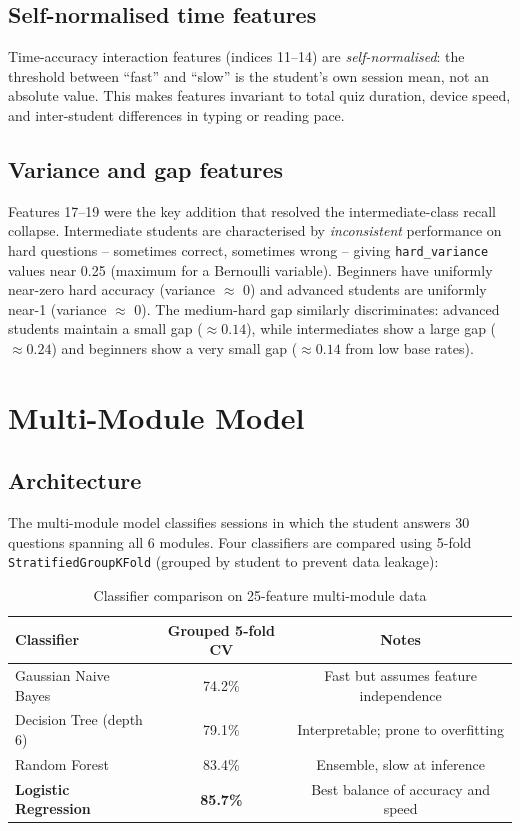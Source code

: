 \documentclass[12pt,a4paper]{article}
\begin{document}
\subsection{Self-normalised time features}

Time-accuracy interaction features (indices 11--14) are \emph{self-normalised}: the
threshold between ``fast'' and ``slow'' is the student's own session mean, not an
absolute value. This makes features invariant to total quiz duration, device speed,
and inter-student differences in typing or reading pace.

\subsection{Variance and gap features}

Features 17--19 were the key addition that resolved the intermediate-class recall
collapse. Intermediate students are characterised by \emph{inconsistent} performance
on hard questions -- sometimes correct, sometimes wrong -- giving \texttt{hard\_variance}
values near 0.25 (maximum for a Bernoulli variable). Beginners have uniformly near-zero
hard accuracy (variance $\approx$ 0) and advanced students are uniformly near-1
(variance $\approx$ 0). The medium-hard gap similarly discriminates: advanced students
maintain a small gap ($\approx 0.14$), while intermediates show a large gap ($\approx
0.24$) and beginners show a very small gap ($\approx 0.14$ from low base rates).

\section{Multi-Module Model}
\label{sec:multimodule}

\subsection{Architecture}

The multi-module model classifies sessions in which the student answers 30 questions
spanning all 6 modules. Four classifiers are compared using 5-fold
\texttt{StratifiedGroupKFold} (grouped by student to prevent data leakage):

\begin{table}[H]
\centering
\caption{Classifier comparison on 25-feature multi-module data}
\begin{tabular}{@{}lcc@{}}
\toprule
Classifier & Grouped 5-fold CV & Notes \\
\midrule
Gaussian Naive Bayes   & 74.2\% & Fast but assumes feature independence \\
Decision Tree (depth 6)& 79.1\% & Interpretable; prone to overfitting \\
Random Forest          & 83.4\% & Ensemble, slow at inference \\
\textbf{Logistic Regression} & \textbf{85.7\%} & Best balance of accuracy and speed \\
\bottomrule
\end{tabular}
\end{table}
\end{document}
